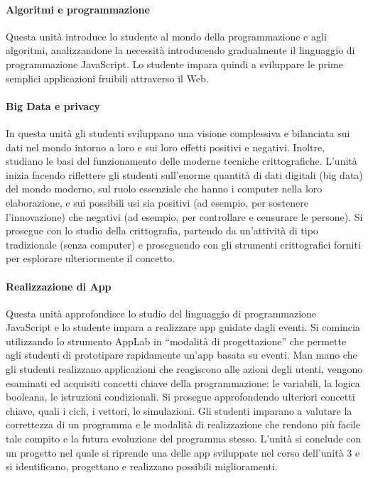 \documentclass[11pt,a4paper]{article}
\begin{document}
\paragraph{Algoritmi e programmazione}
Questa unità introduce lo studente al mondo della programmazione e
agli algoritmi, analizzandone la necessità introducendo gradualmente
il linguaggio di programmazione JavaScript. Lo studente impara quindi
a sviluppare le prime semplici applicazioni fruibili attraverso il
Web.

\paragraph{Big Data e privacy}
In questa unità gli studenti sviluppano una visione complessiva e
bilanciata sui dati nel mondo intorno a loro e sui loro effetti
positivi e negativi. Inoltre, studiano le basi del funzionamento delle
moderne tecniche crittografiche.  L'unità inizia facendo riflettere
gli studenti sull'enorme quantità di dati digitali (big data) del
mondo moderno, sul ruolo essenziale che hanno i computer nella loro
elaborazione, e sui possibili usi sia positivi (ad esempio, per
sostenere l'innovazione) che negativi (ad esempio, per controllare e
censurare le persone).  Si prosegue con lo studio della crittografia,
partendo da un'attività di tipo tradizionale (senza computer) e
proseguendo con gli strumenti crittografici forniti per esplorare
ulteriormente il concetto.

\paragraph{Realizzazione di App}
Questa unità approfondisce lo studio del linguaggio di programmazione
JavaScript e lo studente impara a realizzare app guidate dagli
eventi. Si comincia utilizzando lo strumento AppLab in ``modalità di
progettazione'' che permette agli studenti di prototipare rapidamente
un'app basata su eventi. Man mano che gli studenti realizzano
applicazioni che reagiscono alle azioni degli utenti, vengono
esaminati ed acquisiti concetti chiave della programmazione: le
variabili, la logica booleana, le istruzioni condizionali. Si prosegue
approfondendo ulteriori concetti chiave, quali i cicli, i vettori, le
simulazioni. Gli studenti imparano a valutare la correttezza di un
programma e le modalità di realizzazione che rendono più facile tale
compito e la futura evoluzione del programma stesso. L'unità si
conclude con un progetto nel quale si riprende una delle app
sviluppate nel corso dell'unità 3 e si identificano, progettano e
realizzano possibili miglioramenti.
\end{document}
